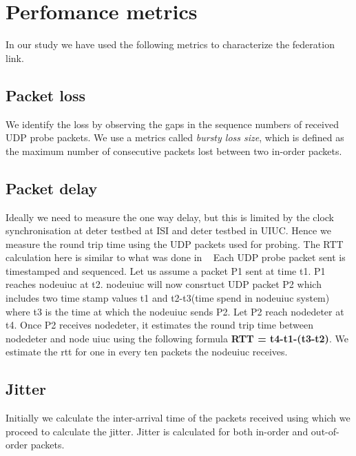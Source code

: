 \documentclass{sig-alternate-10pt} \usepackage{enumerate}
\begin{document}



\section{Perfomance metrics} 
\label{sec:perfomance metrics}

In our study we have used the following metrics to characterize the federation link.

\subsection{Packet loss} 
\label{sec:Packet loss}

We identify the loss by observing the gaps in the sequence numbers of received UDP probe packets.
We use a metrics called {\it bursty loss size}, which is defined as the maximum number of consecutive
packets lost between two in-order packets. 

\subsection{Packet delay} 
\label{sec:Packet delay}

Ideally we need to measure the one way delay, but this is limited by the clock synchronisation at deter testbed at ISI and
deter testbed in UIUC. Hence we measure the round trip time using the UDP packets used for probing. The RTT calculation here is similar to what was done in ~\cite{SRM}
Each UDP probe packet sent is timestamped and sequenced. Let us assume a packet P1 sent at time t1. P1 reaches nodeuiuc at t2. nodeuiuc
will now consrtuct UDP packet P2 which includes two time stamp values t1 and t2-t3(time spend in nodeuiuc system) where t3 is the time at which the nodeuiuc
sends P2. Let P2 reach nodedeter at t4. Once P2 receives nodedeter, it estimates the round trip time between nodedeter and node uiuc using the following formula {\textbf {RTT = t4-t1-(t3-t2)}}.
 We estimate the rtt for one in every ten packets the nodeuiuc receives.

\subsection{Jitter}
\label{sec:Jitter}
Initially we calculate the inter-arrival time of the packets received using which we proceed to 
calculate the jitter. Jitter is calculated for both in-order and out-of-order packets.
\end{document}
